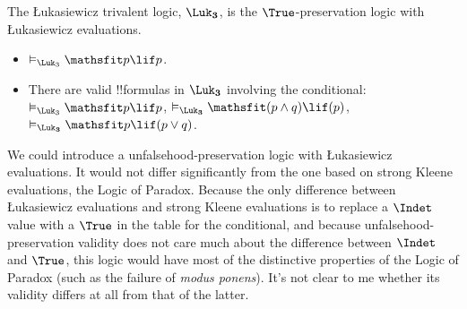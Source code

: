 \documentclass[../../../include/open-logic-section]{subfiles}
\begin{document}
The Łukasiewicz trivalent logic, $\Log{\Luk_3}$, is the $\True$-preservation logic with Łukasiewicz evaluations. 

\begin{itemize}
  \item $\Entails[\Log \Luk_3] \Obj p \lif p$. 
  \item There are valid !!{formula}s in $\Log{\Luk_3}$ involving the conditional: $\Entails[\Log \Luk_3] \Obj p \lif p$, $\Entails[\Log{\Luk_3}] \Obj (p \land q) \lif (p)$, $\Entails[\Log{\Luk_3}] \Obj p \lif (p \lor q)$.
\end{itemize}

\begin{digress}
We could introduce a unfalsehood-preservation logic with Łukasiewicz evaluations. It would not differ significantly from the one based on strong Kleene evaluations, the Logic of Paradox. Because the only difference between Łukasiewicz evaluations and strong Kleene evaluations is to replace a $\Indet$ value with a $\True$ in the table for the conditional, and because unfalsehood-preservation validity does not care much about the difference between $\Indet$ and $\True$, this logic would have most of the distinctive properties of the Logic of Paradox (such as the failure of \emph{modus ponens}). It's not clear to me whether its validity differs at all from that of the latter.
\end{digress}
\end{document}
